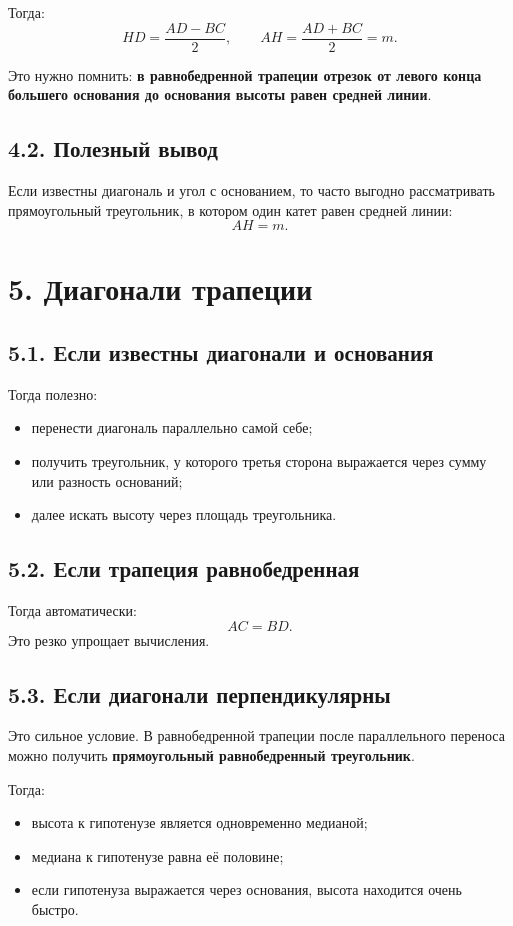 \documentclass[a4paper,12pt]{article}
\newcommand{\med}{m}
\begin{document}
Тогда:
\[
HD=\frac{AD-BC}{2},
\qquad
AH=\frac{AD+BC}{2}=\med.
\]

Это нужно помнить: \textbf{в равнобедренной трапеции отрезок от левого конца большего основания до основания высоты равен средней линии}.

\subsection*{\textcolor{accent}{4.2. Полезный вывод}}
Если известны диагональ и угол с основанием, то часто выгодно рассматривать прямоугольный треугольник, в котором один катет равен средней линии:
\[
AH=\med.
\]

\section*{\textcolor{darkaccent}{5. Диагонали трапеции}}

\subsection*{\textcolor{accent}{5.1. Если известны диагонали и основания}}
Тогда полезно:
\begin{itemize}
    \item перенести диагональ параллельно самой себе;
    \item получить треугольник, у которого третья сторона выражается через сумму или разность оснований;
    \item далее искать высоту через площадь треугольника.
\end{itemize}

\subsection*{\textcolor{accent}{5.2. Если трапеция равнобедренная}}
Тогда автоматически:
\[
AC=BD.
\]
Это резко упрощает вычисления.

\subsection*{\textcolor{accent}{5.3. Если диагонали перпендикулярны}}
Это сильное условие. В равнобедренной трапеции после параллельного переноса можно получить \textbf{прямоугольный равнобедренный треугольник}.

Тогда:
\begin{itemize}
    \item высота к гипотенузе является одновременно медианой;
    \item медиана к гипотенузе равна её половине;
    \item если гипотенуза выражается через основания, высота находится очень быстро.
\end{itemize}
\end{document}
